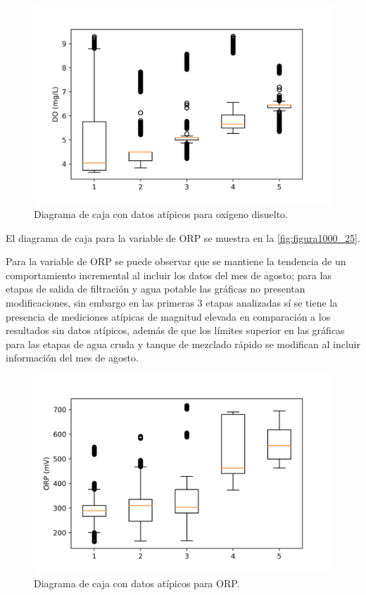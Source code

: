 \clearpage

\begin{figure}[h]
	\centering
	\includegraphics[scale=1.0]{imgss174.png}
	\caption{Diagrama de caja con datos atípicos para oxígeno disuelto.}
	\label{fig:figura1000_24}
\end{figure}

El diagrama de caja para la variable de ORP se muestra en la \autoref{fig:figura1000_25}.

Para la variable de ORP se puede observar que se mantiene la tendencia de un comportamiento incremental al incluir los datos del mes de agosto; para las etapas de salida de filtración y agua potable las gráficas no presentan 
modificaciones, sin embargo en las primeras 3 etapas analizadas sí se tiene la presencia de mediciones atípicas de magnitud elevada en comparación a los resultados sin datos atípicos, además de que los límites superior en 
las gráficas para las etapas de agua cruda y tanque de mezclado rápido se modifican al incluir información del mes de agosto.

\clearpage

\begin{figure}[h]
	\centering
	\includegraphics[scale=1.0]{imgss175.png}
	\caption{Diagrama de caja con datos atípicos para ORP.}
	\label{fig:figura1000_25}
\end{figure}

